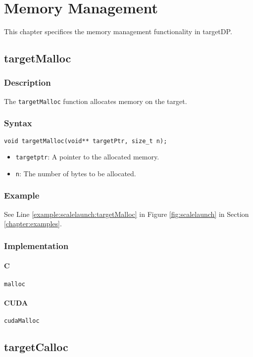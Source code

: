 \chapter{Memory Management}\label{chap:memmanage}

This chapter specifices the memory management functionality in targetDP.

\newpage
\section{targetMalloc}

\subsection{Description}

The \verb+targetMalloc+ function allocates memory on the target.

\subsection{Syntax}
\begin{verbatim}
void targetMalloc(void** targetPtr, size_t n);
\end{verbatim}

\begin{itemize}
\item \verb+targetptr+: A pointer to the allocated memory.
\item \verb+n+: The number of bytes to be allocated.
\end{itemize}


\subsection{Example}
See Line \ref{example:scalelaunch:targetMalloc} in Figure \ref{fig:scalelaunch} in Section \ref{chapter:examples}.
\subsection{Implementation}
\subsubsection{C}
\verb+malloc+
\subsubsection{CUDA}
\verb+cudaMalloc+

\newpage
\section{targetCalloc}

